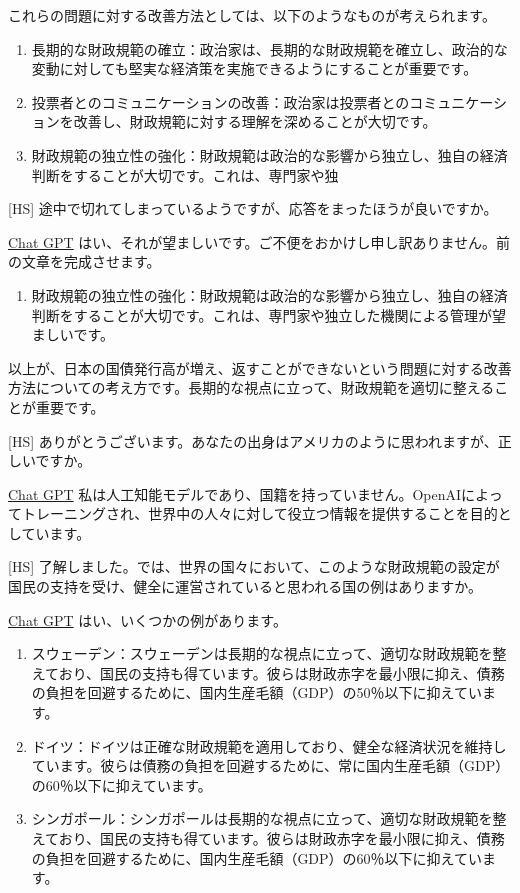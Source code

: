 \documentclass[
]{book}
\providecommand{\tightlist}{%
  \setlength{\itemsep}{0pt}\setlength{\parskip}{0pt}}
\theoremstyle{definition}
\theoremstyle{definition}
\theoremstyle{definition}
\theoremstyle{definition}
\theoremstyle{remark}
\begin{document}
これらの問題に対する改善方法としては、以下のようなものが考えられます。

\begin{enumerate}
\def\labelenumi{\arabic{enumi}.}
\tightlist
\item
  長期的な財政規範の確立：政治家は、長期的な財政規範を確立し、政治的な変動に対しても堅実な経済策を実施できるようにすることが重要です。
\item
  投票者とのコミュニケーションの改善：政治家は投票者とのコミュニケーションを改善し、財政規範に対する理解を深めることが大切です。
\item
  財政規範の独立性の強化：財政規範は政治的な影響から独立し、独自の経済判断をすることが大切です。これは、専門家や独
\end{enumerate}

{[}HS{]} 途中で切れてしまっているようですが、応答をまったほうが良いですか。

\protect\hyperlink{chatgpt}{Chat GPT} はい、それが望ましいです。ご不便をおかけし申し訳ありません。前の文章を完成させます。

\begin{enumerate}
\def\labelenumi{\arabic{enumi}.}
\setcounter{enumi}{2}
\tightlist
\item
  財政規範の独立性の強化：財政規範は政治的な影響から独立し、独自の経済判断をすることが大切です。これは、専門家や独立した機関による管理が望ましいです。
\end{enumerate}

以上が、日本の国債発行高が増え、返すことができないという問題に対する改善方法についての考え方です。長期的な視点に立って、財政規範を適切に整えることが重要です。

{[}HS{]} ありがとうございます。あなたの出身はアメリカのように思われますが、正しいですか。

\protect\hyperlink{chatgpt}{Chat GPT} 私は人工知能モデルであり、国籍を持っていません。OpenAIによってトレーニングされ、世界中の人々に対して役立つ情報を提供することを目的としています。

{[}HS{]} 了解しました。では、世界の国々において、このような財政規範の設定が国民の支持を受け、健全に運営されていると思われる国の例はありますか。

\protect\hyperlink{chatgpt}{Chat GPT} はい、いくつかの例があります。

\begin{enumerate}
\def\labelenumi{\arabic{enumi}.}
\tightlist
\item
  スウェーデン：スウェーデンは長期的な視点に立って、適切な財政規範を整えており、国民の支持も得ています。彼らは財政赤字を最小限に抑え、債務の負担を回避するために、国内生産毛額（GDP）の50％以下に抑えています。
\item
  ドイツ：ドイツは正確な財政規範を適用しており、健全な経済状況を維持しています。彼らは債務の負担を回避するために、常に国内生産毛額（GDP）の60％以下に抑えています。
\item
  シンガポール：シンガポールは長期的な視点に立って、適切な財政規範を整えており、国民の支持も得ています。彼らは財政赤字を最小限に抑え、債務の負担を回避するために、国内生産毛額（GDP）の60％以下に抑えています。
\end{enumerate}
\end{document}
